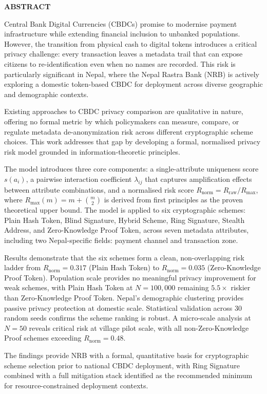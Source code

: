 \newpage
\begin{center}
{\Large \textbf{ABSTRACT}}\\[1cm]
\end{center}

Central Bank Digital Currencies (CBDCs) promise to modernise payment
infrastructure while extending financial inclusion to unbanked populations.
However, the transition from physical cash to digital tokens introduces a
critical privacy challenge: every transaction leaves a metadata trail that
can expose citizens to re-identification even when no names are recorded.
This risk is particularly significant in Nepal, where the Nepal Rastra Bank
(NRB) is actively exploring a domestic token-based CBDC for deployment
across diverse geographic and demographic contexts.

Existing approaches to CBDC privacy comparison are qualitative in nature,
offering no formal metric by which policymakers can measure, compare, or
regulate metadata de-anonymization risk across different cryptographic
scheme choices. This work addresses that gap by developing a formal,
normalised privacy risk model grounded in information-theoretic principles.

The model introduces three core components: a single-attribute uniqueness
score $s(a_i)$, a pairwise interaction coefficient $\lambda_{ij}$ that
captures amplification effects between attribute combinations, and a
normalised risk score $R_{\mathrm{norm}} = R_{\mathrm{raw}} / R_{\mathrm{max}}$,
where $R_{\mathrm{max}}(m) = m + \binom{m}{2}$ is derived from first
principles as the proven theoretical upper bound. The model is applied to
six cryptographic schemes: Plain Hash Token, Blind Signature, Hybrid Scheme,
Ring Signature, Stealth Address, and Zero-Knowledge Proof Token, across seven metadata
attributes, including two Nepal-specific fields: payment channel and
transaction zone.

Results demonstrate that the six schemes form a clean, non-overlapping risk
ladder from $R_{\mathrm{norm}} = 0.317$ (Plain Hash Token) to
$R_{\mathrm{norm}} = 0.035$ (Zero-Knowledge Proof Token). Population scale provides no
meaningful privacy improvement for weak schemes, with Plain Hash Token at
$N = 100{,}000$ remaining $5.5\times$ riskier than Zero-Knowledge Proof Token. Nepal's
demographic clustering provides passive privacy protection at domestic scale.
Statistical validation across 30 random seeds confirms the scheme ranking is
robust. A micro-scale analysis at $N = 50$ reveals critical risk at village
pilot scale, with all non-Zero-Knowledge Proof schemes exceeding $R_{\mathrm{norm}} = 0.48$.

The findings provide NRB with a formal, quantitative basis for cryptographic
scheme selection prior to national CBDC deployment, with Ring Signature
combined with a full mitigation stack identified as the recommended minimum
for resource-constrained deployment contexts.